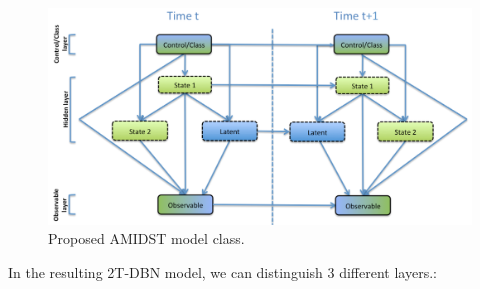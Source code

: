 \begin{figure}[ht!]
\begin{center}
\includegraphics[scale=0.465]{./figures/AMIDSTModelClass}
\caption{\label{Figure:AMIDSTModelClass} Proposed AMIDST model class.}
\end{center}
\end{figure}


In the resulting 2T-DBN model, we can distinguish 3 different layers.:

